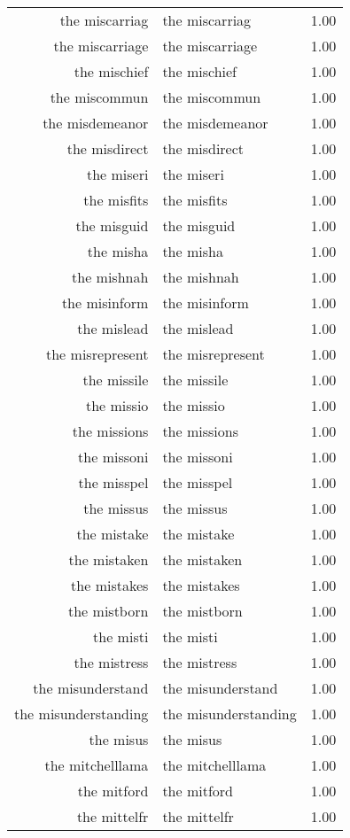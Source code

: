 \begin{table}[ht]
\begin{tabular}{rlr}
  the miscarriag & the miscarriag & 1.00 \\ 
  the miscarriage & the miscarriage & 1.00 \\ 
  the mischief & the mischief & 1.00 \\ 
  the miscommun & the miscommun & 1.00 \\ 
  the misdemeanor & the misdemeanor & 1.00 \\ 
  the misdirect & the misdirect & 1.00 \\ 
  the miseri & the miseri & 1.00 \\ 
  the misfits & the misfits & 1.00 \\ 
  the misguid & the misguid & 1.00 \\ 
  the misha & the misha & 1.00 \\ 
  the mishnah & the mishnah & 1.00 \\ 
  the misinform & the misinform & 1.00 \\ 
  the mislead & the mislead & 1.00 \\ 
  the misrepresent & the misrepresent & 1.00 \\ 
  the missile & the missile & 1.00 \\ 
  the missio & the missio & 1.00 \\ 
  the missions & the missions & 1.00 \\ 
  the missoni & the missoni & 1.00 \\ 
  the misspel & the misspel & 1.00 \\ 
  the missus & the missus & 1.00 \\ 
  the mistake & the mistake & 1.00 \\ 
  the mistaken & the mistaken & 1.00 \\ 
  the mistakes & the mistakes & 1.00 \\ 
  the mistborn & the mistborn & 1.00 \\ 
  the misti & the misti & 1.00 \\ 
  the mistress & the mistress & 1.00 \\ 
  the misunderstand & the misunderstand & 1.00 \\ 
  the misunderstanding & the misunderstanding & 1.00 \\ 
  the misus & the misus & 1.00 \\ 
  the mitchelllama & the mitchelllama & 1.00 \\ 
  the mitford & the mitford & 1.00 \\ 
  the mittelfr & the mittelfr & 1.00 \\ 

\end{tabular}
\end{table}
